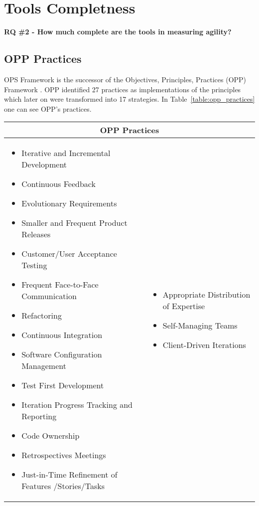\chapter{Tools Completness}

\textbf{RQ \#2 - How much complete are the tools in measuring agility?}

\section{OPP Practices} %
OPS Framework is the successor of the Objectives, Principles, Practices (OPP) Framework \cite{opp}. OPP identified 27 practices as implementations of the principles which later on were transformed into 17 strategies. In Table~\ref{table:opp_practices} one can see OPP's practices.

\begin{tabular}{| p{7.5cm}  p{7.5cm} |}
	\hline
	\multicolumn{2}{|c|}{\textbf{OPP Practices}}  \\ \hline
     	\begin{itemize}
     		\item Iterative and Incremental Development 
     		\item Continuous Feedback 
     		\item Evolutionary Requirements 
     		\item Smaller and Frequent Product Releases 
     		\item Customer/User Acceptance Testing 
     		\item Frequent Face-to-Face Communication 
     		\item Refactoring 
			\item Continuous Integration
     		\item Software Configuration Management 
     		\item Test First Development 
     		\item Iteration Progress Tracking and Reporting 
     		\item Code Ownership 
     		\item Retrospectives Meetings 
     		\item Just-in-Time Refinement of Features /Stories/Tasks 
     	\end{itemize} 
     	& \begin{itemize}
     	 	\item Appropriate Distribution of Expertise
  			\item Self-Managing Teams 
     		\item Client-Driven Iterations 

\end{itemize}
\end{tabular}
